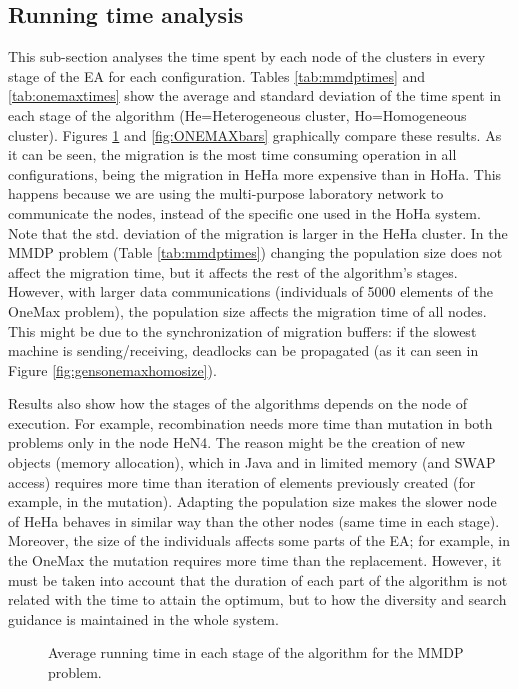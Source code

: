 \documentclass[final,1p,times]{elsarticle}
\begin{document}
\subsection{Running time analysis}

This sub-section analyses the time spent by each node of the clusters in every stage of the EA for each configuration. Tables \ref{tab:mmdptimes} and \ref{tab:onemaxtimes} show the average and standard deviation of the time spent in each stage of the algorithm (He=Heterogeneous cluster, Ho=Homogeneous cluster). Figures \ref{fig:MMDPbars} and \ref{fig:ONEMAXbars} graphically compare these results. As it can be seen, the migration is the most time consuming operation in all configurations, being the migration in HeHa more expensive than in HoHa. This happens because we are using the multi-purpose laboratory network to communicate the nodes, instead of the specific one used in the HoHa system. Note that the std. deviation of the migration is larger in the HeHa cluster. In the MMDP problem (Table \ref{tab:mmdptimes}) changing the population size does not affect the migration time, but it affects the rest of the algorithm's stages. However, with larger data communications (individuals of 5000 elements of the OneMax problem), the population size affects the migration time of all nodes. This might be due to the synchronization of migration buffers: if the slowest machine is sending/receiving, deadlocks can be propagated (as it can seen in Figure \ref{fig:gensonemaxhomosize}). 

Results also show how the stages of the algorithms depends on the node
of execution. For example, recombination needs more time than mutation
in both problems only in the node HeN4. The reason might be the
creation of new objects (memory allocation), which in Java and in
limited memory (and SWAP access) requires more time than iteration of
elements previously created (for example, in the mutation). Adapting
the population size makes the slower node of HeHa behaves in similar
way than the other nodes (same time in each stage). Moreover, the size
of the individuals affects some parts of the EA; for example, in the
OneMax the mutation requires more time than the replacement. However,
it must be taken into account that the duration of each part of the
algorithm is not related with the time to attain the optimum, but to
how the diversity and search guidance is maintained in the whole system.  

\begin{figure}[htb]
\centering
{}
\caption{Average running time in each stage of the algorithm for the MMDP problem.}
\label{fig:MMDPbars}
\end{figure}
\end{document}
